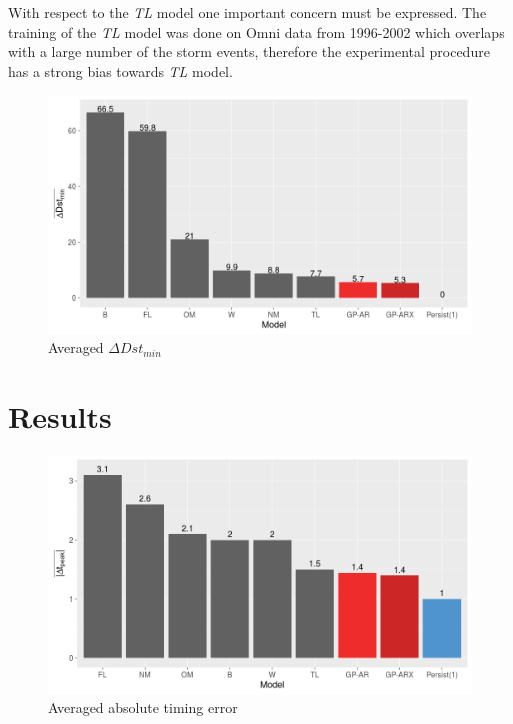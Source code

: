 \documentclass[referee,a4paper,12pt,traditabstract]{swsc}
\begin{document}
\begin{linenumbers}
With respect to the \emph{TL} model one important concern must be expressed. The training of the \emph{TL} model was done on Omni data from 1996-2002 which overlaps with a large number of the storm events, therefore the experimental procedure has a strong bias towards \emph{TL} model.


\begin{figure}
   \centering
   \includegraphics[width=\textwidth]{Compare_deltaDst.png}
      \caption{Averaged $\Delta Dst_{min}$}
         \label{fig:deltaDst}
   \end{figure}



\section{Results} \label{sec:res}
\begin{figure}
   \centering
   \includegraphics[width=\textwidth]{Compare_timingerr.png}
      \caption{Averaged absolute timing error}
         \label{fig:timingErr}
   \end{figure}




\end{linenumbers}
\end{document}
